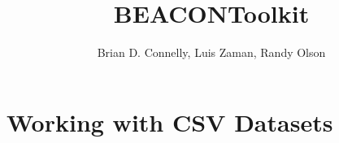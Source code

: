 \documentclass[letterpaper,oneside,onecolumn]{book}
\begin{document}
    \title{BEACONToolkit}
    \author{Brian D. Connelly, Luis Zaman, Randy Olson}
    \maketitle

    \tableofcontents

    \clearpage

    \chapter{Working with CSV Datasets}
    



\end{document}
